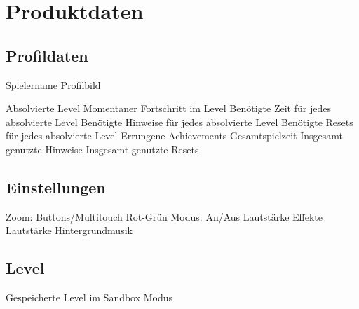 \section{Produktdaten}

\subsection{Profildaten}
\begin{requirements}
	\begin{requirements}
		 Spielername
		 Profilbild
	\end{requirements}
	
	\req [Spielfortschritt] {D20}
	\begin{requirements}
		 Absolvierte Level
		 Momentaner Fortschritt im Level
		 Benötigte Zeit für jedes absolvierte Level
		 Benötigte Hinweise für jedes absolvierte Level
		 Benötigte Resets für jedes absolvierte Level
		 Errungene Achievements
		 Gesamtspielzeit
		 Insgesamt genutzte Hinweise
		 Insgesamt genutzte Resets
	\end{requirements}
\end{requirements}

\subsection{Einstellungen}
\begin{requirements}
	 Zoom: Buttons/Multitouch
	 Rot-Grün Modus: An/Aus
	 Lautstärke Effekte
	 Lautstärke Hintergrundmusik
	
\end{requirements}

\subsection{Level}
\begin{requirements}
	 Gespeicherte Level im Sandbox Modus
\end{requirements}
	

